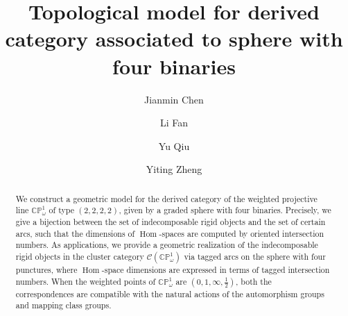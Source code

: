 \documentclass[11pt,a4paper,reqno]{amsart}%
\theoremstyle{plain}
\theoremstyle{definition}
\numberwithin{equation}{section}
\numberwithin{equation}{section}
\begin{document}
\title [Top models: sphere with four binaries]
 {Topological model for derived  category  associated to  sphere with four binaries}


\author{Jianmin Chen}
\address{Cj: School of Mathematical Sciences, Xiamen University, 361005 Xiamen,  China.}


\author{Li Fan}
\address{Fl: Morningside Center of Mathematics, Chinese Academy of Sciences, 100190 Beijing, China.}

 \author{Yu Qiu}
\address{Qy:
	Yau Mathematical Sciences Center and Department of Mathematical Sciences,
	Tsinghua University,
    100084 Beijing,
    China.
    \&
    Beijing Institute of Mathematical Sciences and Applications, Yanqi Lake, Beijing, China.}



\author{Yiting Zheng}
\address{Zy: School of Mathematical Sciences, Xiamen University, 361005 Xiamen, China.}

 
 

\dedicatory{}

\begin{abstract}
We construct a geometric model for the derived category of the weighted projective line $\mathbb{CP}^1_{\omega}$ of type $(2,2,2,2)$, given by a graded sphere with four binaries. 
Precisely, we give a bijection between the set of indecomposable rigid objects and the set of certain arcs, such that the dimensions of  $\operatorname{Hom}$-spaces are computed by oriented intersection numbers.
As applications, we provide a geometric realization of the indecomposable rigid objects in the cluster category $\mathcal{C}(\mathbb{CP}^1_{\omega})$ via tagged arcs on the sphere with four punctures, where $\operatorname{Hom}$-space dimensions are expressed in terms of tagged intersection numbers. 
When the weighted points of $\mathbb{CP}^1_{\omega}$ are $(0,1,\infty,\frac{1}{2})$,  both  the correspondences are compatible with the natural actions of the automorphism groups and mapping class groups.
\end{abstract}
 
\end{document}
